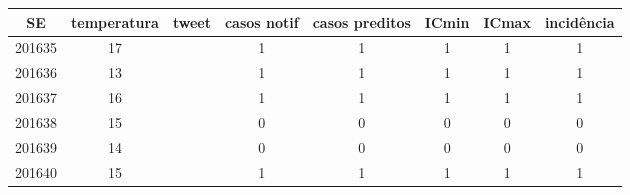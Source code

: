 \begin{tabular}{c|ccccccc}
  \hline
SE & temperatura & tweet & casos notif & casos preditos & ICmin & ICmax & incidência \\ 
  \hline
201635 & 17 &  & 1 & 1 & 1 & 1 & 1 \\ 
  201636 & 13 &  & 1 & 1 & 1 & 1 & 1 \\ 
  201637 & 16 &  & 1 & 1 & 1 & 1 & 1 \\ 
  201638 & 15 &  & 0 & 0 & 0 & 0 & 0 \\ 
  201639 & 14 &  & 0 & 0 & 0 & 0 & 0 \\ 
  201640 & 15 &  & 1 & 1 & 1 & 1 & 1 \\ 
   \hline
\end{tabular}
